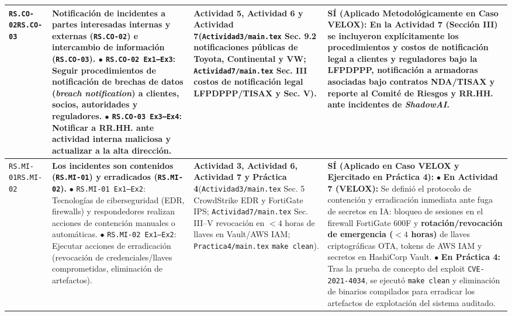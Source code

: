 \documentclass[letterpaper,11pt]{article}
\begin{document}
\begin{longtable}{|C{1.5cm}|L{5.3cm}|L{4.3cm}|L{5.8cm}|}
\texttt{RS.CO-02}\newline \texttt{RS.CO-03} &
\textbf{Notificación de incidentes a partes interesadas internas y externas (\texttt{RS.CO-02}) e intercambio de información (\texttt{RS.CO-03}).}\newline
$\bullet$ \texttt{RS.CO-02 Ex1--Ex3}: Seguir procedimientos de notificación de brechas de datos (\textit{breach notification}) a clientes, socios, autoridades y reguladores.\newline
$\bullet$ \texttt{RS.CO-03 Ex3--Ex4}: Notificar a RR.HH. ante actividad interna maliciosa y actualizar a la alta dirección. &
\textbf{Actividad 5, Actividad 6 y Actividad 7}\newline (\texttt{Actividad3/main.tex} Sec. 9.2 notificaciones públicas de Toyota, Continental y VW; \texttt{Actividad7/main.tex} Sec. III costos de notificación legal LFPDPPP/TISAX y Sec. V). &
\textbf{SÍ (Aplicado Metodológicamente en Caso VELOX):}\newline
En la Actividad 7 (Sección III) se incluyeron explícitamente los procedimientos y costos de notificación legal a clientes y reguladores bajo la \textbf{LFPDPPP}, notificación a armadoras asociadas bajo contratos \textbf{NDA/TISAX} y reporte al Comité de Riesgos y RR.HH. ante incidentes de \textit{ShadowAI}. \\
\hline

\texttt{RS.MI-01}\newline \texttt{RS.MI-02} &
\textbf{Los incidentes son contenidos (\texttt{RS.MI-01}) y erradicados (\texttt{RS.MI-02}).}\newline
$\bullet$ \texttt{RS.MI-01 Ex1--Ex2}: Tecnologías de ciberseguridad (EDR, firewalls) y respondedores realizan acciones de contención manuales o automáticas.\newline
$\bullet$ \texttt{RS.MI-02 Ex1--Ex2}: Ejecutar acciones de erradicación (revocación de credenciales/llaves comprometidas, eliminación de artefactos). &
\textbf{Actividad 3, Actividad 6, Actividad 7 y Práctica 4}\newline (\texttt{Actividad3/main.tex} Sec. 5 CrowdStrike EDR y FortiGate IPS; \texttt{Actividad7/main.tex} Sec. III--V revocación en $<4$ horas de llaves en Vault/AWS IAM; \texttt{Practica4/main.tex} \texttt{make clean}). &
\textbf{SÍ (Aplicado en Caso VELOX y Ejercitado en Práctica 4):}\newline
$\bullet$ \textbf{En Actividad 7 (VELOX):} Se definió el protocolo de contención y erradicación inmediata ante fuga de secretos en IA: bloqueo de sesiones en el firewall FortiGate 600F y \textbf{rotación/revocación de emergencia ($<4$ horas)} de llaves criptográficas OTA, tokens de AWS IAM y secretos en HashiCorp Vault.\newline
$\bullet$ \textbf{En Práctica 4:} Tras la prueba de concepto del exploit \texttt{CVE-2021-4034}, se ejecutó \texttt{make clean} y eliminación de binarios compilados para erradicar los artefactos de explotación del sistema auditado. \\
\hline
\end{longtable}
\endgroup
\end{document}
